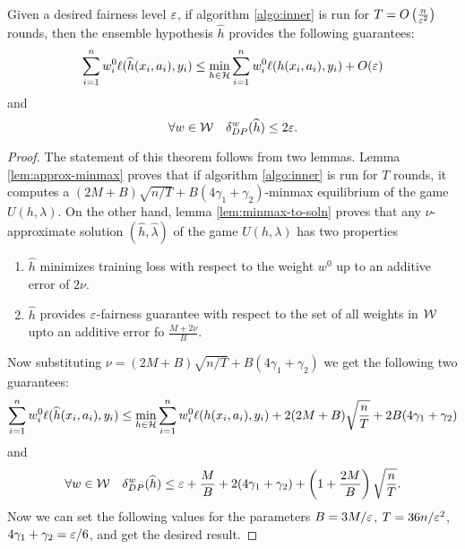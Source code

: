 \begin{theorem}
Given a desired fairness level $\varepsilon$, if algorithm \ref{algo:inner} is run for $T= O\left(\frac{n}{\varepsilon^2} \right)$ rounds, then the ensemble hypothesis $\hat{h}$ provides the following guarantees:
$$\sum_{i=1}^n w^0_i \ell(\widehat{h}(x_i,a_i),y_i) \le \min_{h \in \mathcal{H}}\sum_{i=1}^n w^0_i \ell({h}(x_i,a_i),y_i) + O(\varepsilon)$$
and
$$\forall w \in \mathcal{W}\quad \delta^w_{DP}(\widehat{h}) \le 2\varepsilon.$$
\end{theorem}
\begin{proof}
The statement of this theorem follows from two lemmas. Lemma \ref{lem:approx-minmax} proves that if algorithm \ref{algo:inner} is run for $T$ rounds, it computes a $(2M + B)\sqrt{n/T} + B(4\gamma_1 + \gamma_2)$-minmax equilibrium of the game $U(h,\lambda)$. On the other hand, lemma \ref{lem:minmax-to-soln} proves that any $\nu$-approximate solution $(\hat{h},\hat{\lambda})$ of the game $U(h,\lambda)$ has two properties
\begin{enumerate}
\item $\hat{h}$ minimizes training loss with respect to the weight $w^0$ up to an additive error of $2\nu$.
\item $\hat{h}$ provides $\varepsilon$-fairness guarantee with respect to the set of all weights in $\mathcal{W}$ upto an additive error fo $\frac{M + 2\nu}{B}$.
\end{enumerate}
Now substituting $\nu = (2M + B)\sqrt{n/T} + B(4\gamma_1 + \gamma_2)$ we get the following two guarantees:
$$\sum_{i=1}^n w^0_i \ell(\widehat{h}(x_i,a_i),y_i) \le \min_{h \in \mathcal{H}}\sum_{i=1}^n w^0_i \ell({h}(x_i,a_i),y_i) + 2(2M+B)\sqrt{\frac{n}{T}} + 2B(4\gamma_1 + \gamma_2)$$
and 
$$\forall w \in \mathcal{W}\quad \delta^w_{DP}(\widehat{h}) \le \varepsilon + \frac{M}{B} + 2(4\gamma_1 + \gamma_2) + \left(1 + \frac{2M}{B} \right)\sqrt{\frac{n}{T}}.$$
Now we can set the following values for the parameters $B=3M/\varepsilon$, $T=36n/\varepsilon^2$, $4\gamma_1 + \gamma_2 = \varepsilon/6$, and get the desired result. 
\end{proof}

